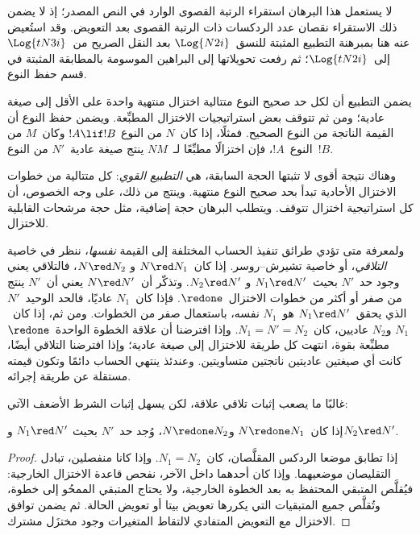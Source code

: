 \documentclass[../../../include/open-logic-section]{subfiles}
\begin{document}
\begin{editorial}
  لا يستعمل هذا البرهان استقراء الرتبة القصوى الوارد في النص المصدر؛ إذ لا
  يضمن ذلك الاستقراء نقصان عدد الردكسات ذات الرتبة القصوى بعد التعويض. وقد
  استُعيض عنه هنا بمبرهنة التطبيع المثبتة للنسق~$\Log{N2i}$ بعد النقل
  الصريح من~$\Log{tN3i}$ إلى~$\Log{tN2i}$؛ ثم رفعت تحويلاتها إلى البراهين
  الموسومة بالمطابقة المثبتة في قسم حفظ النوع.
\end{editorial}

يضمن التطبيع أن لكل حد صحيح النوع متتالية اختزال منتهية واحدة على الأقل إلى
صيغة عادية؛ ومن ثم تتوقف بعض استراتيجيات الاختزال المطبِّعة. ويضمن حفظ النوع
أن القيمة الناتجة من النوع الصحيح. فمثلًا، إذا كان~$N$ من النوع
$!A\lif !B$ وكان~$M$ من النوع~$!A$، فإن اختزالًا مطبِّعًا لـ~$NM$ ينتج
صيغة عادية~$N'$ من النوع~$!B$.

وهناك نتيجة أقوى لا تثبتها الحجة السابقة، هي \emph{التطبيع القوي}: كل
متتالية من خطوات الاختزال الأحادية تبدأ بحد صحيح النوع منتهية. وينتج من ذلك،
على وجه الخصوص، أن كل استراتيجية اختزال تتوقف. ويتطلب البرهان حجة إضافية،
مثل حجة مرشحات القابلية للاختزال.

ولمعرفة متى تؤدي طرائق تنفيذ الحساب المختلفة إلى القيمة \emph{نفسها}، ننظر
في خاصية \emph{التلاقي}، أو خاصية تشيرش--روسر. إذا كان~$N\red N_1$ و
$N\red N_2$، فالتلاقي يعني وجود حد~$N'$ بحيث~$N_1\red N'$ و
$N_2\red N'$. وتذكّر أن~$N\red N'$ يعني أن~$N'$ ينتج من صفر أو أكثر من
خطوات الاختزال~$\redone$. فإذا كان~$N_1$ عاديًا، فالحد الوحيد~$N'$ الذي
يحقق~$N_1\red N'$ هو~$N_1$ نفسه، باستعمال صفر من الخطوات. ومن ثم، إذا
كان~$N_1$ و$N_2$ عاديين، كان~$N_1=N'=N_2$. وإذا افترضنا أن علاقة الخطوة
الواحدة~$\redone$ مطبِّعة بقوة، انتهت كل طريقة للاختزال إلى صيغة عادية؛
وإذا افترضنا التلاقي أيضًا، كانت أي صيغتين عاديتين ناتجتين متساويتين. وعندئذ
ينتهي الحساب دائمًا وتكون قيمته مستقلة عن طريقة إجرائه.

غالبًا ما يصعب إثبات تلاقي علاقة، لكن يسهل إثبات الشرط الأضعف الآتي:

\begin{prop}
إذا كان~$N\redone N_1$ و$N\redone N_2$، وُجد حد~$N'$ بحيث
$N_1\red N'$ و$N_2\red N'$.
\end{prop}

\begin{proof}
  إذا تطابق موضعا الردكس المقلَّصان، كان~$N_1=N_2$. وإذا كانا منفصلين،
  تبادل التقليصان موضعيهما. وإذا كان أحدهما داخل الآخر، نفحص قاعدة الاختزال
  الخارجية: فيُقلَّص المتبقي المحتفظ به بعد الخطوة الخارجية، ولا يحتاج
  المتبقي الممحُو إلى خطوة، وتُقلَّص جميع المتبقيات التي يكررها تعويض بيتا أو
  تعويض الحالة. ثم يضمن توافق الاختزال مع التعويض المتفادي لالتقاط المتغيرات
  وجود مختزَل مشترك.
\end{proof}
\end{document}
